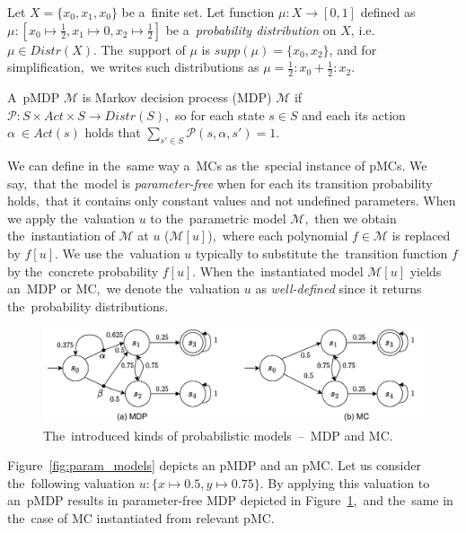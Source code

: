\begin{example}
    Let $X = \{x_0, x_1, x_0\}$ be a~finite set.
    Let function $\mu: X \rightarrow [0,1]$ defined as $\mu: [x_0 \mapsto \frac{1}{2}, x_1 \mapsto 0, x_2 \mapsto \frac{1}{2}]$ be a~\textit{probability distribution} on $X$, i.e. $\mu \in Distr(X)$.
    The~support of $\mu$ is $supp(\mu) = \{x_0, x_2 \}$, and for simplification,~we writes such distributions as $\mu = \frac{1}{2} : x_0 + \frac{1}{2} : x_2$.
\end{example}


\begin{definition}[MDP]
    A~pMDP $\mathcal{M}$ is Markov decision process (MDP) $\mathcal{M}$ if $\mathcal{P}: S \times Act \times S \rightarrow Distr(S)$,~so for each state $s \in S$ and each its action $\alpha~\in Act(s)$ holds that $\sum_{s' \in S}{\mathcal{P}(s, \alpha, s')} = 1$.
\end{definition}
\noindent 
We can define in the~same way a~MCs as the~special instance of pMCs.
We say,~that the~model is \textit{parameter-free} when for each its transition probability holds,~that it contains only constant values and not undefined parameters.
When we apply the~valuation $u$ to the~parametric model $\mathcal{M}$,~then we obtain the~instantiation of $\mathcal{M}$ at $u$ ($\mathcal{M}[u]$),~where each polynomial $f \in \mathcal{M}$ is replaced by $f[u]$.
We use the~valuation $u$ typically to substitute the~transition function $f$ by the~concrete probability $f[u]$.
When the~instantiated model $\mathcal{M}[u]$ yields an~MDP or MC,~we denote the~valuation $u$ as \textit{well-defined} since it returns the~probability distributions.

\begin{figure}[h!]
\centering
\includegraphics[width=1.0\textwidth]{figures/models.pdf}
\caption{The~introduced kinds of probabilistic models \,--\, MDP and MC.}%
\label{fig:models}%
\end{figure}

\begin{example}
Figure~\ref{fig:param_models} depicts an pMDP and an pMC.
Let us consider the~following valuation $u: \{ x \mapsto 0.5, y \mapsto 0.75 \}$.
By applying this valuation to an~pMDP results in parameter-free MDP depicted in Figure~\ref{fig:models},~and the~same in the~case of MC instantiated from relevant pMC.
\end{example}

